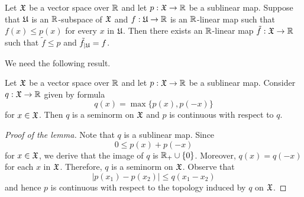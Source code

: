 \begin{theorem}\label{theorem:Hahn_Banach_real_case}
Let ${\mathfrak X}$ be a vector space over ${\mathbb R}$ and let $p:{\mathfrak X}\rightarrow {\mathbb R}$ be a sublinear map. Suppose that ${\mathfrak U}$ is an ${\mathbb R}$-subspace of ${\mathfrak X}$ and $f:{\mathfrak U}\rightarrow {\mathbb R}$ is an ${\mathbb R}$-linear map such that $f(x) \leq p(x)$ for every $x$ in ${\mathfrak U}$. Then there exists an ${\mathbb R}$-linear map $\tilde{f}:{\mathfrak X} \rightarrow {\mathbb R}$ such that $\tilde{f} \leq p$ and $\tilde{f}_{\mid {\mathfrak U}} = f$. 
\end{theorem}
\noindent
We need the following result.

\begin{lemma}\label{lemma:sublinear_induces_seminorm_and_is_continuous_with_respect_to_it}
Let ${\mathfrak X}$ be a vector space over ${\mathbb R}$ and let $p:{\mathfrak X} \rightarrow {\mathbb R}$ be a sublinear map. Consider $q:{\mathfrak X} \rightarrow {\mathbb R}$ given by formula
$$q(x) = \max\{p(x),p(-x)\}$$
for $x \in {\mathfrak X}$. Then $q$ is a seminorm on ${\mathfrak X}$ and $p$ is continuous with respect to $q$. 
\end{lemma}
\begin{proof}[Proof of the lemma]
Note that $q$ is a sublinear map. Since 
$$0\leq p(x) + p(-x)$$
for $x \in {\mathfrak X}$, we derive that the image of $q$ is ${\mathbb R}_+\cup \{0\}$. Moreover, $q(x) = q(-x)$ for each $x$ in ${\mathfrak X}$. Therefore, $q$ is a seminorm on ${\mathfrak X}$. Observe that
$$|p(x_1) - p(x_2)|\leq q(x_1 - x_2)$$
and hence $p$ is continuous with respect to the topology induced by $q$ on ${\mathfrak X}$.
\end{proof}

